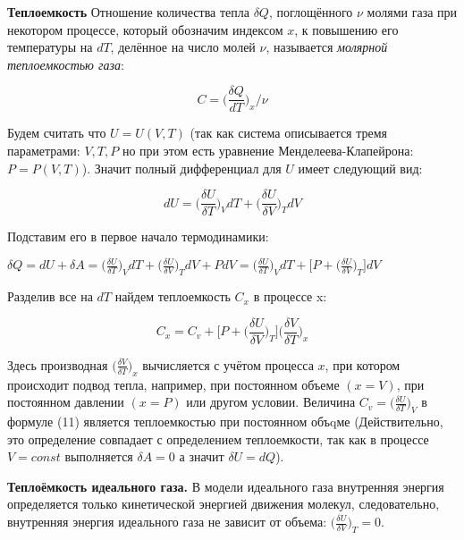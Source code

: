 \documentclass[10pt]{article}
\begin{document}
    \textbf{Теплоемкость}
    Отношение количества тепла $\delta Q$, поглощённого $\nu$ молями газа при некотором процессе, который обозначим индексом $x$, к повышению его температуры на $dT$, делённое на число молей $\nu$, называется \textit{молярной теплоемкостью газа}:

    \begin{equation}
        C = \bigg(\frac{\delta Q}{dT}\bigg)_x / \nu
    \end{equation}

    Будем считать что $U = U(V,T)$ (так как система описывается тремя параметрами: $V,T,P$ но при этом есть уравнение Менделеева-Клапейрона: $P = P(V,T)$).
    Значит полный дифференциал для $U$ имеет следующий вид:

    \begin{equation}
        dU = \bigg(\frac{\delta U}{\delta T}\bigg)_V dT + \bigg(\frac{\delta U}{\delta V}\bigg)_T dV
    \end{equation}

    Подставим его в первое начало термодинамики:

    $  \delta Q = dU + \delta A =  \bigg(\frac{\delta U}{\delta T}\bigg)_V dT + \bigg(\frac{\delta U}{\delta V}\bigg)_T dV + PdV = \bigg(\frac{\delta U}{\delta T}\bigg)_V dT + \bigg[P + \bigg(\frac{\delta U}{\delta V}\bigg)_T \bigg] dV $

    Разделив все на $dT$ найдем теплоемкость $C_x$ в процессе x:

    \begin{equation}
        C_x = C_v + \bigg[P + \bigg(\frac{\delta U}{\delta V}\bigg)_T \bigg] \bigg(\frac{\delta V}{\delta T}\bigg)_x
    \end{equation}

    Здесь производная $\bigg(\frac{\delta V}{\delta T}\bigg)_x$ вычисляется с учётом процесса $x$, при котором происходит подвод тепла, например, при постоянном объеме $(x = V)$, при постоянном давлении $(x = P)$ или другом условии. Величина $C_v = \bigg(\frac{\delta U}{\delta T}\bigg)_V$ в формуле (11) является теплоемкостью при постоянном объqме (Действительно, это определение совпадает с определением теплоемкости, так как в процессе $V = const$ выполняется $\delta A = 0$ а значит $\delta U = dQ$).

    \textbf{Теплоёмкость идеального газа.}
    В модели идеального газа внутренняя энергия определяется только кинетической энергией движения молекул, следовательно, внутренняя энергия идеального газа не зависит от объема: $\bigg(\frac{\delta U}{\delta V}\bigg)_T = 0$.
\end{document}
